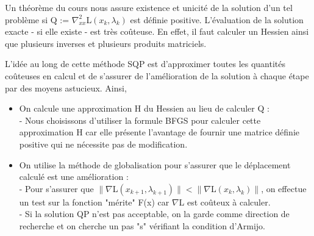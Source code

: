 \par 
Un théorème du cours nous assure existence et unicité de la solution d'un tel problème si Q := $\nabla_{xx}^2 $L$(x_k,\lambda_k)$ est définie positive.
L'évaluation de la solution exacte - si elle existe - est très coûteuse. En effet, il faut calculer un Hessien ainsi que plusieurs inverses et plusieurs produits matriciels. \\
\par 
L'idée au long de cette méthode SQP est d'approximer toutes les quantités coûteuses en calcul et de s'assurer de l'amélioration de la solution à chaque étape par des moyens astucieux.\medbreak
Ainsi,\\
\renewcommand{\labelitemi}{\textbullet}
\begin{itemize}
\item On calcule une approximation H du Hessien au lieu de calculer Q : \\
- Nous choisissons d'utiliser la formule BFGS pour calculer cette approximation H car elle présente l'avantage de fournir 
une matrice définie positive qui ne nécessite pas de modification.\\
\item On utilise la méthode de globalisation pour s'assurer que le déplacement calculé est une amélioration :\\
\indent- Pour s'assurer que $\|    \nabla $L$(x_{k+1},\lambda_{k+1})   \| < \|    \nabla $L$(x_{k},\lambda_{k})   \|$,
on effectue un test sur la fonction "mérite" F(x) car $\nabla $L est coûteux à calculer. \\
\indent- Si la solution QP n'est pas acceptable, on la garde comme direction de recherche et on cherche un pas "s" vérifiant la condition d'Armijo.\\
\end{itemize}
\par

